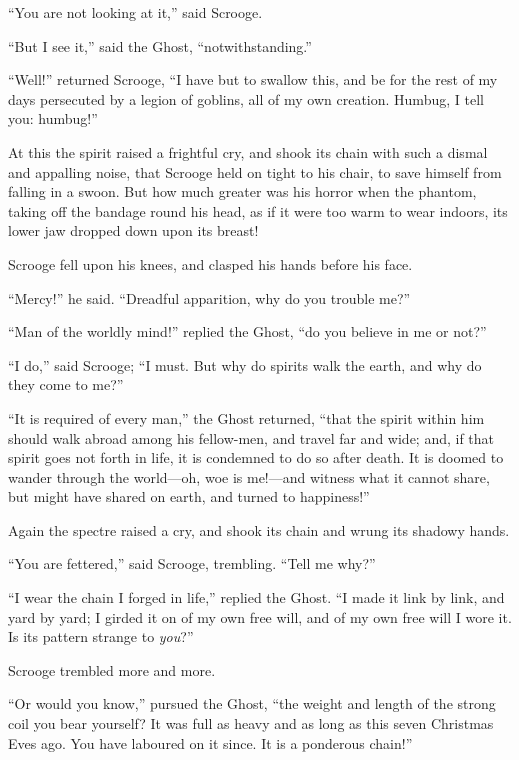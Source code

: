 \documentclass[paper=a5,BCOR=15mm,twoside,DIV=15,headinclude=off,12pt,chapterprefix=off,openany,headings=huge]{scrbook} %
\begin{document}
\enquote{You are not looking at it,} said Scrooge.

\enquote{But I see it,} said the Ghost, \enquote{notwithstanding.}

\enquote{Well!} returned Scrooge, \enquote{I have but to swallow this, and be for the rest of my days persecuted by a legion of goblins, all of my own creation. Humbug, I tell you: humbug!}

At this the spirit raised a frightful cry, and shook its chain with such a dismal and appalling noise, that Scrooge held on tight to his chair, to save himself from falling in a swoon. But how much greater was his horror when the phantom, taking off the bandage round his head, as if it were too warm to wear indoors, its lower jaw dropped down upon its breast!

Scrooge fell upon his knees, and clasped his hands before his face.

\enquote{Mercy!} he said. \enquote{Dreadful apparition, why do you trouble me?}

\enquote{Man of the worldly mind!} replied the Ghost, \enquote{do you believe in me or not?}

\enquote{I do,} said Scrooge; \enquote{I must. But why do spirits walk the earth, and why do they come to me?}

\enquote{It is required of every man,} the Ghost returned, \enquote{that the spirit within him should walk abroad among his fellow-men, and travel far and wide; and, if that spirit goes not forth in life, it is condemned to do so after death. It is doomed to wander through the world—oh, woe is me!—and witness what it cannot share, but might have shared on earth, and turned to happiness!}

Again the spectre raised a cry, and shook its chain and wrung its shadowy hands.

\enquote{You are fettered,} said Scrooge, trembling. \enquote{Tell me why?}

\enquote{I wear the chain I forged in life,} replied the Ghost. \enquote{I made it link by link, and yard by yard; I girded it on of my own free will, and of my own free will I wore it. Is its pattern strange to \textit{you}?}

Scrooge trembled more and more.

\enquote{Or would you know,} pursued the Ghost, \enquote{the weight and length of the strong coil you bear yourself? It was full as heavy and as long as this seven Christmas Eves ago. You have laboured on it since. It is a ponderous chain!}
\end{document}
